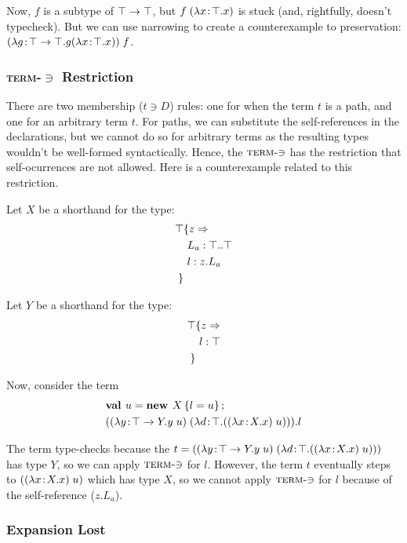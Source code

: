 \documentclass[preprint]{sigplanconf}
\begin{document}
Now, $f$ is a subtype of $\top \rightarrow \top$, but $f\;(\lambda x\!:\!\top.x)$ is stuck (and, rightfully, doesn't typecheck). But we can use
narrowing to create a counterexample to preservation: $(\lambda g\!:\!\top \rightarrow \top.g (\lambda x\!:\!\top.x))\;f$.

\subsubsection{\texorpdfstring{\textsc{term-$\ni$}}{Term-Mem} Restriction}\label{term_mem}

There are two membership ($t \ni D$) rules: one for when the term $t$
is a path, and one for an arbitrary term $t$. For paths, we can
substitute the self-references in the declarations, but we cannot do
so for arbitrary terms as the resulting types wouldn't be well-formed
syntactically. Hence, the $\textsc{term-$\ni$}$ has the restriction
that self-ocurrences are not allowed. Here is a counterexample related
to this restriction.

Let $X$ be a shorthand for the type:
\begin{align*}
\top & \{z \Rightarrow \\
&\ L_a : \top..\top\\
&\ l : z.L_a\\
 \}&
\end{align*}

Let $Y$ be a shorthand for the type:
\begin{align*}
\top & \{z \Rightarrow \\
&\ l : \top\\
 \}&
\end{align*}

Now, consider the term
\begin{align*}
&\mlnew u {X \ldefs{ l = u }}{
(\app {(\abs y {\Top \tfun Y} {\app y u})} {(\abs d \Top {(\app {(\abs x X x)} u)})}).l
}
\end{align*}

The term type-checks because the $t=((\lambda y\!:\!\top \rightarrow Y.y\;u)\;(\lambda d\!:\!\top.((\lambda x\!:\!X.x)\;u)))$ has type
$Y$, so we can apply $\textsc{term-$\ni$}$ for $l$. However, the term
$t$ eventually steps to $((\lambda x\!:\!X.x)\;u)$ which has type $X$,
so we cannot apply $\textsc{term-$\ni$}$ for $l$ because of the
self-reference ($z.L_a$).

\subsubsection{Expansion Lost}\label{narrowing_exp}
\end{document}
